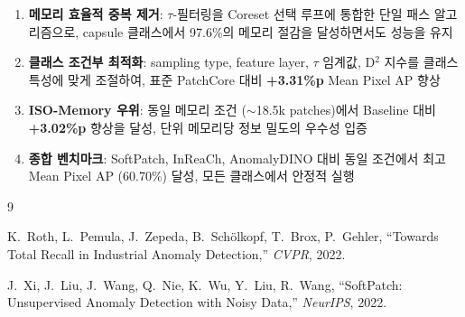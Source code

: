 \documentclass[11pt,a4paper]{article}
\begin{document}
\begin{enumerate}
  \item \textbf{메모리 효율적 중복 제거}: $\tau$-필터링을 Coreset 선택 루프에 통합한 단일 패스 알고리즘으로, capsule 클래스에서 97.6\%의 메모리 절감을 달성하면서도 성능을 유지
  
  \item \textbf{클래스 조건부 최적화}: sampling type, feature layer, $\tau$ 임계값, D$^2$ 지수를 클래스 특성에 맞게 조절하여, 표준 PatchCore 대비 \textbf{+3.31\%p} Mean Pixel AP 향상
  
  \item \textbf{ISO-Memory 우위}: 동일 메모리 조건 ($\sim$18.5k patches)에서 Baseline 대비 \textbf{+3.02\%p} 향상을 달성, 단위 메모리당 정보 밀도의 우수성 입증
  
  \item \textbf{종합 벤치마크}: SoftPatch, InReaCh, AnomalyDINO 대비 동일 조건에서 최고 Mean Pixel AP (60.70\%) 달성, 모든 클래스에서 안정적 실행
\end{enumerate}

\begin{thebibliography}{9}

K.~Roth, L.~Pemula, J.~Zepeda, B.~Sch{\"o}lkopf, T.~Brox, P.~Gehler,
``Towards Total Recall in Industrial Anomaly Detection,''
\textit{CVPR}, 2022.

J.~Xi, J.~Liu, J.~Wang, Q.~Nie, K.~Wu, Y.~Liu, R.~Wang,
``SoftPatch: Unsupervised Anomaly Detection with Noisy Data,''
\textit{NeurIPS}, 2022.

\end{thebibliography}
\end{document}
